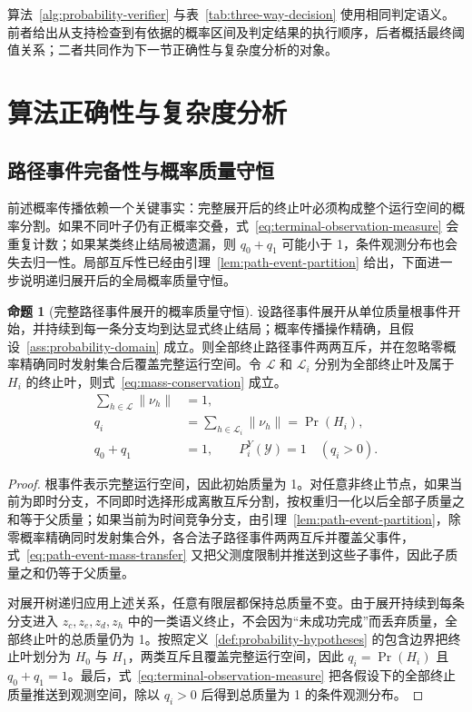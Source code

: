 \documentclass[master,fontset=ubuntu]{shnuthesis}
\theoremstyle{definition}
\newtheorem{thesisproposition}{命题}
\begin{document}
算法~\ref{alg:probability-verifier} 与表~\ref{tab:three-way-decision} 使用相同判定语义。前者给出从支持检查到有依据的概率区间及判定结果的执行顺序，后者概括最终阈值关系；二者共同作为下一节正确性与复杂度分析的对象。

\section{算法正确性与复杂度分析}

\subsection{路径事件完备性与概率质量守恒}

前述概率传播依赖一个关键事实：完整展开后的终止叶必须构成整个运行空间的概率分割。如果不同叶子仍有正概率交叠，式~\eqref{eq:terminal-observation-measure} 会重复计数；如果某类终止结局被遗漏，则 \(q_0+q_1\) 可能小于 1，条件观测分布也会失去归一性。局部互斥性已经由引理~\ref{lem:path-event-partition} 给出，下面进一步说明递归展开后的全局概率质量守恒。

\begin{thesisproposition}[完整路径事件展开的概率质量守恒]
\label{prop:path-event-mass-conservation}
设路径事件展开从单位质量根事件开始，并持续到每一条分支均到达显式终止结局；概率传播操作精确，且假设~\ref{ass:probability-domain} 成立。则全部终止路径事件两两互斥，并在忽略零概率精确同时发射集合后覆盖完整运行空间。令 \(\mathcal L\) 和 \(\mathcal L_i\) 分别为全部终止叶及属于 \(H_i\) 的终止叶，则式~\eqref{eq:mass-conservation} 成立。
\begin{equation}
\begin{aligned}
\sum_{h\in\mathcal L}\|\nu_h\|&=1,\\
q_i&=
\sum_{h\in\mathcal L_i}\|\nu_h\|
=
\Pr(H_i),\\
q_0+q_1&=1,\qquad
P_i^Y(\mathcal Y)=1\quad(q_i>0).
\end{aligned}
\label{eq:mass-conservation}
\end{equation}
\end{thesisproposition}

\begin{proof}
根事件表示完整运行空间，因此初始质量为 1。对任意非终止节点，如果当前为即时分支，不同即时选择形成离散互斥分割，按权重归一化以后全部子质量之和等于父质量；如果当前为时间竞争分支，由引理~\ref{lem:path-event-partition}，除零概率精确同时发射集合外，各合法子路径事件两两互斥并覆盖父事件，式~\eqref{eq:path-event-mass-transfer} 又把父测度限制并推送到这些子事件，因此子质量之和仍等于父质量。

对展开树递归应用上述关系，任意有限层都保持总质量不变。由于展开持续到每条分支进入 \(z_c,z_e,z_d,z_h\) 中的一类语义终止，不会因为“未成功完成”而丢弃质量，全部终止叶的总质量仍为 1。按照定义~\ref{def:probability-hypotheses} 的包含边界把终止叶划分为 \(H_0\) 与 \(H_1\)，两类互斥且覆盖完整运行空间，因此 \(q_i=\Pr(H_i)\) 且 \(q_0+q_1=1\)。最后，式~\eqref{eq:terminal-observation-measure} 把各假设下的全部终止质量推送到观测空间，除以 \(q_i>0\) 后得到总质量为 1 的条件观测分布。
\end{proof}
\end{document}
